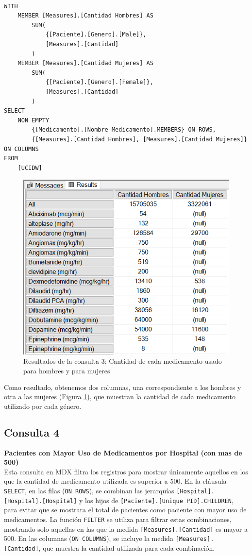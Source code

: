 \documentclass{article}
\begin{document}
\begin{lstlisting}[style=ddlstyle, label=lst:consulta3,caption=Consulta 3: Cantidad de cada medicamento usado para hombres y para mujeres]
	
WITH 
	MEMBER [Measures].[Cantidad Hombres] AS
		SUM(
			{[Paciente].[Genero].[Male]}, 
			[Measures].[Cantidad]
		)
	MEMBER [Measures].[Cantidad Mujeres] AS
		SUM(
			{[Paciente].[Genero].[Female]}, 
			[Measures].[Cantidad]
		)
SELECT 
	NON EMPTY 
		{[Medicamento].[Nombre Medicamento].MEMBERS} ON ROWS,
		{[Measures].[Cantidad Hombres], [Measures].[Cantidad Mujeres]} ON COLUMNS
FROM 
	[UCIDW]
\end{lstlisting}

\begin{figure}[H]
	\centering
	\includegraphics[width=0.5\linewidth]{images/consulta3.png}
	\caption{Resultados de la consulta 3: Cantidad de cada medicamento usado para hombres y para mujeres}
	\label{fig:consulta3}
\end{figure}

Como resultado, obtenemos dos columnas, una correspondiente a los hombres y otra a las mujeres (Figura \ref{fig:consulta3}), que muestran la cantidad de cada medicamento utilizado por cada género.



\subsection{Consulta 4}

\textbf{Pacientes con Mayor Uso de Medicamentos por Hospital (con mas de 500)}
\\

Esta consulta en MDX filtra los registros para mostrar únicamente aquellos en los que la cantidad de medicamento utilizada es superior a 500. En la cláusula \texttt{SELECT}, en las filas (\texttt{ON ROWS}), se combinan las jerarquías \texttt{[Hospital].[Hospital].[Hospital]} y los hijos de \texttt{[Paciente].[Unique PID].CHILDREN}, para evitar que se mostrara el total de pacientes como paciente con mayor uso de medicamentos. La función \texttt{FILTER} se utiliza para filtrar estas combinaciones, mostrando solo aquellas en las que la medida \texttt{[Measures].[Cantidad]} es mayor a 500. En las columnas (\texttt{ON COLUMNS}), se incluye la medida \texttt{[Measures].[Cantidad]}, que muestra la cantidad utilizada para cada combinación. 
\\
\end{document}
